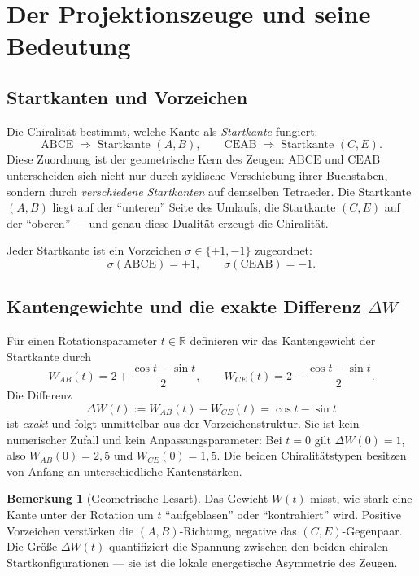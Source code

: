 \documentclass[11pt,a4paper]{article}
\theoremstyle{definition}
\newtheorem{bemerkung}[definition]{Bemerkung}
\theoremstyle{plain}
\newcommand{\R}{\mathbb{R}}
\begin{document}
	\section{Der Projektionszeuge und seine Bedeutung}
	
	\subsection{Startkanten und Vorzeichen}
	
	Die Chiralität bestimmt, welche Kante als \emph{Startkante} fungiert:
	\[
	\mathrm{ABCE}\;\Longrightarrow\;\text{Startkante }(A,B),\qquad
	\mathrm{CEAB}\;\Longrightarrow\;\text{Startkante }(C,E).
	\]
	Diese Zuordnung ist der geometrische Kern des Zeugen: $\mathrm{ABCE}$ und $\mathrm{CEAB}$ unterscheiden sich nicht nur durch zyklische Verschiebung ihrer Buchstaben, sondern durch \emph{verschiedene Startkanten} auf demselben Tetraeder. Die Startkante $(A,B)$ liegt auf der ``unteren'' Seite des Umlaufs, die Startkante $(C,E)$ auf der ``oberen'' --- und genau diese Dualität erzeugt die Chiralität.
	
	Jeder Startkante ist ein Vorzeichen $\sigma\in\{+1,-1\}$ zugeordnet:
	\[
	\sigma(\mathrm{ABCE})=+1,\qquad \sigma(\mathrm{CEAB})=-1.
	\]
	
	\subsection{Kantengewichte und die exakte Differenz $\Delta W$}
	
	Für einen Rotationsparameter $t\in\R$ definieren wir das Kantengewicht der Startkante durch
	\[
	W_{AB}(t)=2+\frac{\cos t-\sin t}{2},
	\qquad
	W_{CE}(t)=2-\frac{\cos t-\sin t}{2}.
	\]
	Die Differenz
	\[
	\Delta W(t):=W_{AB}(t)-W_{CE}(t)=\cos t-\sin t
	\]
	ist \emph{exakt} und folgt unmittelbar aus der Vorzeichenstruktur. Sie ist kein numerischer Zufall und kein Anpassungsparameter: Bei $t=0$ gilt $\Delta W(0)=1$, also $W_{AB}(0)=2{,}5$ und $W_{CE}(0)=1{,}5$. Die beiden Chiralitätstypen besitzen von Anfang an unterschiedliche Kantenstärken.
	
	\begin{bemerkung}[Geometrische Lesart]
		Das Gewicht $W(t)$ misst, wie stark eine Kante unter der Rotation um $t$ ``aufgeblasen'' oder ``kontrahiert'' wird. Positive Vorzeichen verstärken die $(A,B)$-Richtung, negative das $(C,E)$-Gegenpaar. Die Größe $\Delta W(t)$ quantifiziert die Spannung zwischen den beiden chiralen Startkonfigurationen --- sie ist die lokale energetische Asymmetrie des Zeugen.
	\end{bemerkung}
	
\end{document}
